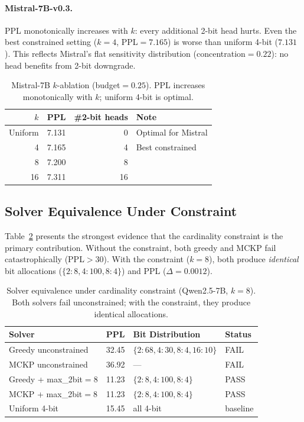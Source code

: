 \documentclass[11pt,a4paper]{article}
\begin{document}
\paragraph{Mistral-7B-v0.3.}
PPL monotonically increases with $k$: every additional 2-bit head hurts.
Even the best constrained setting ($k{=}4$, PPL$=7.165$) is worse than uniform 4-bit ($7.131$).
This reflects Mistral's flat sensitivity distribution (concentration$=0.22$): no head benefits from 2-bit downgrade.

\begin{table}[h]
\centering
\caption{Mistral-7B $k$-ablation (budget$=0.25$). PPL increases monotonically with $k$; uniform 4-bit is optimal.}
\label{tab:mistral_k_ablation}
\begin{tabular}{@{}rrrl@{}}
\toprule
$k$ & PPL & \#2-bit heads & Note \\
\midrule
Uniform & 7.131 & 0 & Optimal for Mistral \\
4  & 7.165 & 4  & Best constrained \\
8  & 7.200 & 8  & \\
16 & 7.311 & 16 & \\
\bottomrule
\end{tabular}
\end{table}

\subsection{Solver Equivalence Under Constraint}

Table~\ref{tab:solver_equivalence} presents the strongest evidence that the cardinality constraint is the primary contribution.
Without the constraint, both greedy and MCKP fail catastrophically (PPL$>$30).
With the constraint ($k{=}8$), both produce \emph{identical} bit allocations ($\{2{:}8, 4{:}100, 8{:}4\}$) and PPL ($\Delta = 0.0012$).

\begin{table}[h]
\centering
\caption{Solver equivalence under cardinality constraint (Qwen2.5-7B, $k{=}8$). Both solvers fail unconstrained; with the constraint, they produce identical allocations.}
\label{tab:solver_equivalence}
\begin{tabular}{@{}lrll@{}}
\toprule
Solver & PPL & Bit Distribution & Status \\
\midrule
Greedy unconstrained & 32.45 & $\{2{:}68, 4{:}30, 8{:}4, 16{:}10\}$ & FAIL \\
MCKP unconstrained & 36.92 & --- & FAIL \\
Greedy + max\_2bit$=$8 & 11.23 & $\{2{:}8, 4{:}100, 8{:}4\}$ & PASS \\
MCKP + max\_2bit$=$8 & 11.23 & $\{2{:}8, 4{:}100, 8{:}4\}$ & PASS \\
Uniform 4-bit & 15.45 & all 4-bit & baseline \\
\bottomrule
\end{tabular}
\end{table}
\end{document}
